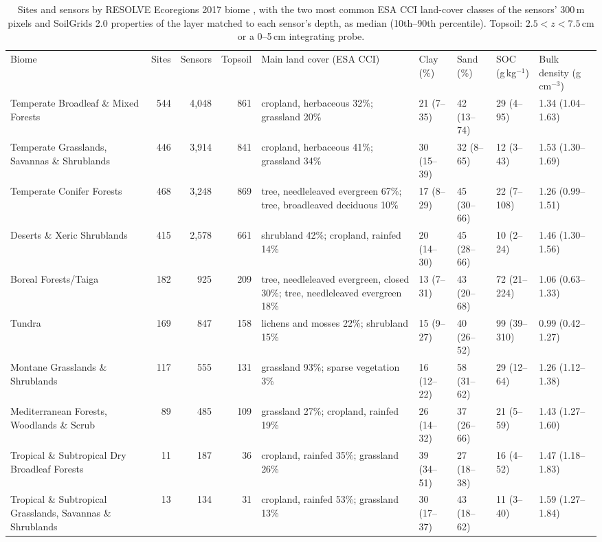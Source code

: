 \begin{table}[t]
\caption{Sites and sensors by RESOLVE Ecoregions 2017 biome \citep{dinerstein2017}, with the two most common ESA CCI land-cover classes of the sensors' 300\,m pixels and SoilGrids 2.0 properties of the layer matched to each sensor's depth, as median (10th--90th percentile). Topsoil: $2.5 < z < 7.5$\,cm or a 0--5\,cm integrating probe.}
\label{tab:biome-soil}
\centering
\scriptsize
\begin{tabular}{p{3.2cm}rrrp{4.2cm}llll}
\tophline
Biome & Sites & Sensors & Topsoil & Main land cover (ESA CCI) & Clay (\%) & Sand (\%) & SOC (g\,kg$^{-1}$) & Bulk density (g\,cm$^{-3}$) \\
\middlehline
Temperate Broadleaf \& Mixed Forests & 544 & 4,048 & 861 & cropland, herbaceous 32\%; grassland 20\% & 21 (7--35) & 42 (13--74) & 29 (4--95) & 1.34 (1.04--1.63) \\
Temperate Grasslands, Savannas \& Shrublands & 446 & 3,914 & 841 & cropland, herbaceous 41\%; grassland 34\% & 30 (15--39) & 32 (8--65) & 12 (3--43) & 1.53 (1.30--1.69) \\
Temperate Conifer Forests & 468 & 3,248 & 869 & tree, needleleaved evergreen 67\%; tree, broadleaved deciduous 10\% & 17 (8--29) & 45 (30--66) & 22 (7--108) & 1.26 (0.99--1.51) \\
Deserts \& Xeric Shrublands & 415 & 2,578 & 661 & shrubland 42\%; cropland, rainfed 14\% & 20 (14--30) & 45 (28--66) & 10 (2--24) & 1.46 (1.30--1.56) \\
Boreal Forests/Taiga & 182 & 925 & 209 & tree, needleleaved evergreen, closed 30\%; tree, needleleaved evergreen 18\% & 13 (7--31) & 43 (20--68) & 72 (21--224) & 1.06 (0.63--1.33) \\
Tundra & 169 & 847 & 158 & lichens and mosses 22\%; shrubland 15\% & 15 (9--27) & 40 (26--52) & 99 (39--310) & 0.99 (0.42--1.27) \\
Montane Grasslands \& Shrublands & 117 & 555 & 131 & grassland 93\%; sparse vegetation 3\% & 16 (12--22) & 58 (31--62) & 29 (12--64) & 1.26 (1.12--1.38) \\
Mediterranean Forests, Woodlands \& Scrub & 89 & 485 & 109 & grassland 27\%; cropland, rainfed 19\% & 26 (14--32) & 37 (26--66) & 21 (5--59) & 1.43 (1.27--1.60) \\
Tropical \& Subtropical Dry Broadleaf Forests & 11 & 187 & 36 & cropland, rainfed 35\%; grassland 26\% & 39 (34--51) & 27 (18--38) & 16 (4--52) & 1.47 (1.18--1.83) \\
Tropical \& Subtropical Grasslands, Savannas \& Shrublands & 13 & 134 & 31 & cropland, rainfed 53\%; grassland 13\% & 30 (17--37) & 43 (18--62) & 11 (3--40) & 1.59 (1.27--1.84) \\

\end{tabular}
\end{table}
